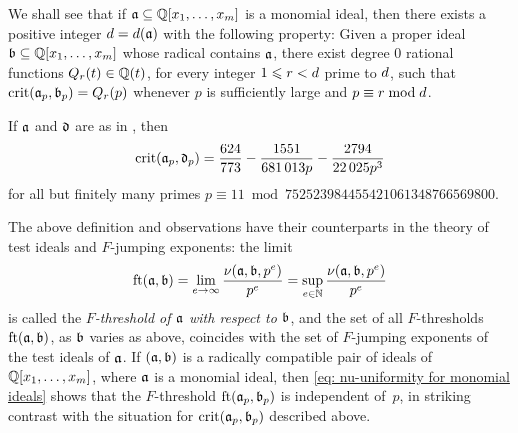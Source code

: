 \documentclass{amsart}
\begin{document}
We shall see that if $\mathfrak{a} \subseteq \mathbb{Q}[x_1,\ldots,x_m]$ is a monomial ideal, then there exists a positive integer $d = d(\mathfrak{a})$ with the following property:
Given a proper ideal $\mathfrak{b} \subseteq \mathbb{Q}[x_1,\ldots,x_m]$ whose radical contains $\mathfrak{a}$, there exist degree $0$ rational functions $Q_r(t) \in \mathbb{Q}(t)$, for every integer $1 \leqslant r < d$ prime to $d$, such that $\operatorname{crit}(\mathfrak{a}_p, \mathfrak{b}_p) = Q_r(p)$ whenever $p$ is sufficiently large and $p \equiv r \bmod d$.


\begin{example}
   If $\mathfrak{a}$ and $\mathfrak{d}$ are as in , then 
   \[
      \operatorname{crit}(\mathfrak{a}_p,\mathfrak{d}_p) =
      \frac{624}{773} - \frac{\num{1551}}{\num{681013} p} - \frac{\num{2794}}{\num{22025} p^3}
   \]
   for all but finitely many primes $p \equiv 11 \bmod \num{752523984455421061348766569800}$.
\end{example}

The above definition and observations have their counterparts in the theory of test ideals and $F$-jumping exponents: the limit
\[
   \operatorname{ft}(\mathfrak{a}, \mathfrak{b}) = \lim_{e\to \infty} \frac{\nu(\mathfrak{a},\mathfrak{b},p^e)}{p^e}
   = \sup_{e\in \mathbb{N}} \frac{\nu(\mathfrak{a},\mathfrak{b},p^e)}{p^e}
\]
is called the \emph{$F$-threshold of $\mathfrak{a}$ with respect to $\mathfrak{b}$}, and the set of all $F$-thresholds $\operatorname{ft}(\mathfrak{a}, \mathfrak{b})$, as $\mathfrak{b}$ varies as above, coincides with the set of $F$-jumping exponents of the test ideals of $\mathfrak{a}$.
If $(\mathfrak{a},\mathfrak{b})$ is a radically compatible pair of ideals of  $\mathbb{Q}[x_1,\ldots,x_m]$, where $\mathfrak{a}$ is a monomial ideal, then \eqref{eq: nu-uniformity for monomial ideals} shows that the $F$-threshold $\operatorname{ft}(\mathfrak{a}_p, \mathfrak{b}_p)$ is independent of~$p$, in striking contrast with the situation for $\operatorname{crit}(\mathfrak{a}_p,\mathfrak{b}_p)$ described above.
\end{document}

